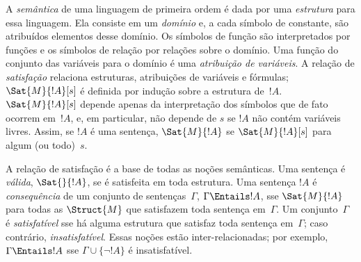A \emph{semântica} de uma linguagem de primeira ordem é dada por uma
\emph{estrutura} para essa linguagem. Ela consiste em um \emph{domínio} e,
a cada símbolo de constante, são atribuídos elementos desse domínio. Os símbolos
de função são interpretados por funções e os símbolos de relação por relações
sobre o domínio. Uma função do conjunto das variáveis para o domínio é
uma \emph{atribuição de variáveis}. A relação de \emph{satisfação}
relaciona estruturas, atribuições de variáveis e fórmulas;
$\Sat{M}{!A}[s]$ é definida por indução sobre a estrutura de~$!A$.
$\Sat{M}{!A}[s]$ depende apenas da interpretação dos símbolos
que de fato ocorrem em~$!A$, e, em particular, não depende de $s$
se $!A$ não contém variáveis livres. Assim, se $!A$ é uma sentença,
$\Sat{M}{!A}$ se $\Sat{M}{!A}[s]$ para algum (ou todo)~$s$.

A relação de satisfação é a base de todas as noções semânticas. Uma
sentença é \emph{válida}, $\Sat{{}}{!A}$, se é satisfeita em toda
estrutura. Uma sentença $!A$ é \emph{consequência} de um conjunto de
sentenças~$\Gamma$, $\Gamma \Entails !A$, sse $\Sat{M}{!A}$ para todas as
$\Struct{M}$ que satisfazem toda sentença em~$\Gamma$. Um conjunto~$\Gamma$
é \emph{satisfatível} sse há alguma estrutura que satisfaz toda
sentença em~$\Gamma$; caso contrário, \emph{insatisfatível}. Essas noções estão
inter-relacionadas; por exemplo, $\Gamma \Entails !A$ sse $\Gamma \cup \{\lnot
!A\}$ é insatisfatível.
